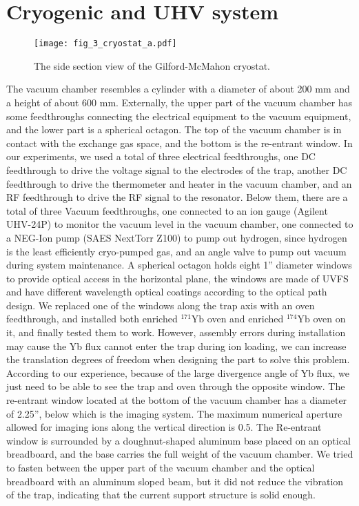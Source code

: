 \section{Cryogenic and UHV system}

\begin{figure}
    \centering
    \texttt{[image: fig\_3\_cryostat\_a.pdf]}
    \caption{The side section view of the Gilford-McMahon cryostat.}
    \label{fig:cryostat_a}
\end{figure}

The vacuum chamber resembles a cylinder with a diameter of about 200 mm and a height of about 600 mm. Externally, the upper part of the vacuum chamber has some feedthroughs connecting the electrical equipment to the vacuum equipment, and the lower part is a spherical octagon. The top of the vacuum chamber is in contact with the exchange gas space, and the bottom is the re-entrant window. In our experiments, we used a total of three electrical feedthroughs, one DC feedthrough to drive the voltage signal to the electrodes of the trap, another DC feedthrough to drive the thermometer and heater in the vacuum chamber, and an RF feedthrough to drive the RF signal to the resonator. Below them, there are a total of three Vacuum feedthroughs, one connected to an ion gauge (Agilent UHV-24P) to monitor the vacuum level in the vacuum chamber, one connected to a NEG-Ion pump (SAES NextTorr Z100) to pump out hydrogen, since hydrogen is the least efficiently cryo-pumped gas, and an angle valve to pump out vacuum during system maintenance. A spherical octagon holds eight 1'' diameter windows to provide optical access in the horizontal plane, the windows are made of UVFS and have different wavelength optical coatings according to the optical path design. We replaced one of the windows along the trap axis with an oven feedthrough, and installed both enriched ${ }^{171} \mathrm{Yb}$ oven and enriched ${ }^{174} \mathrm{Yb}$ oven on it, and finally tested them to work. However, assembly errors during installation may cause the Yb flux cannot enter the trap during ion loading, we can increase the translation degrees of freedom when designing the part to solve this problem. According to our experience, because of the large divergence angle of Yb flux, we just need to be able to see the trap and oven through the opposite window. The re-entrant window located at the bottom of the vacuum chamber has a diameter of 2.25'', below which is the imaging system. The maximum numerical aperture allowed for imaging ions along the vertical direction is 0.5. The Re-entrant window is surrounded by a doughnut-shaped aluminum base placed on an optical breadboard, and the base carries the full weight of the vacuum chamber. We tried to fasten between the upper part of the vacuum chamber and the optical breadboard with an aluminum sloped beam, but it did not reduce the vibration of the trap, indicating that the current support structure is solid enough.

